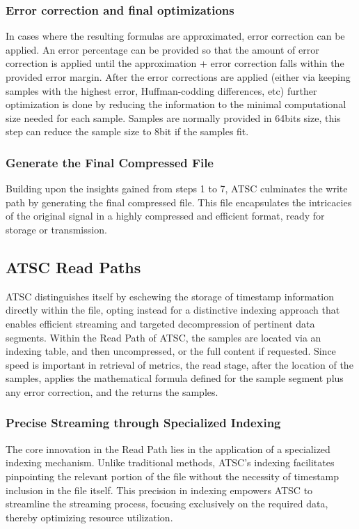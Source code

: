 \documentclass[conference]{IEEEtran}
\begin{document}
\vspace{10pt}
\subsubsection{Error correction and final optimizations}
In cases where the resulting formulas are approximated, error correction can be applied. An error percentage can be provided so that the amount of error correction is applied until the approximation + error correction falls within the provided error margin. After the error corrections are applied (either via keeping samples with the highest error, Huffman-codding differences, etc) further optimization is done by reducing the information to the minimal computational size needed for each sample. Samples are normally provided in 64bits size, this step can reduce the sample size to 8bit if the samples fit.

\vspace{10pt}
\subsubsection{Generate the Final Compressed File}
Building upon the insights gained from steps 1 to 7, ATSC culminates the write path by generating the final compressed file. This file encapsulates the intricacies of the original signal in a highly compressed and efficient format, ready for storage or transmission.


\subsection{ATSC Read Paths}

ATSC distinguishes itself by eschewing the storage of timestamp information directly within the file, opting instead for a distinctive indexing approach that enables efficient streaming and targeted decompression of pertinent data segments.
Within the Read Path of ATSC, the samples are located via an indexing table, and then uncompressed, or the full content if requested. 
Since speed is important in retrieval of metrics, the read stage, after the location of the samples, applies the mathematical formula defined for the sample segment plus any error correction, and the returns the samples. 

\vspace{10pt}
\subsubsection{Precise Streaming through Specialized Indexing}\label{SCMA}
The core innovation in the Read Path lies in the application of a specialized indexing mechanism. Unlike traditional methods, ATSC's indexing facilitates pinpointing the relevant portion of the file without the necessity of timestamp inclusion in the file itself. This precision in indexing empowers ATSC to streamline the streaming process, focusing exclusively on the required data, thereby optimizing resource utilization. 
\end{document}
